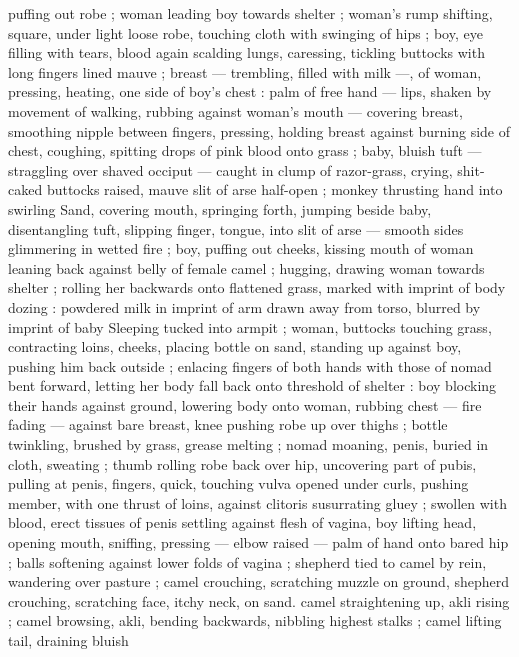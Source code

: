 {puffing out robe ; woman leading boy towards shelter ; woman's 
rump shifting, square, under light loose robe, touching cloth with 
swinging of hips ; boy, eye filling with tears, blood again scalding 
lungs, caressing, tickling buttocks with long fingers lined mauve ; 
breast --- trembling, filled with milk ---, of woman, pressing, heating, 
one side of boy's chest : palm of free hand --- lips, shaken by 
movement of walking, rubbing against woman's mouth --- covering 
breast, smoothing nipple between fingers, pressing, holding breast 
against burning side of chest, coughing, spitting drops of pink blood 
onto grass ; baby, bluish tuft --- straggling over shaved occiput --- 
caught in clump of razor-grass, crying, shit-caked buttocks raised, 
mauve slit of arse half-open ; monkey thrusting hand into swirling 
Sand, covering mouth, springing forth, jumping beside baby, 
disentangling tuft, slipping finger, tongue, into slit of arse --- smooth 
sides glimmering in wetted fire ; boy, puffing out cheeks, kissing 
mouth of woman leaning back against belly of female camel ; 
hugging, drawing woman towards shelter ; rolling her backwards onto 
flattened grass, marked with imprint of body dozing : powdered milk 
in imprint of arm drawn away from torso, blurred by imprint of baby 
Sleeping tucked into armpit ; woman, buttocks touching grass, 
contracting loins, cheeks, placing bottle on sand, standing up against 
boy, pushing him back outside ; enlacing fingers of both hands with 
those of nomad bent forward, letting her body fall back onto 
threshold of shelter : boy blocking their hands against ground, 
lowering body onto woman, rubbing chest --- fire fading --- against 
bare breast, knee pushing robe up over thighs ; bottle twinkling, 
brushed by grass, grease melting ; nomad moaning, penis, buried in 
cloth, sweating ; thumb rolling robe back over hip, uncovering part of 
pubis, pulling at penis, fingers, quick, touching vulva opened under 
curls, pushing member, with one thrust of loins, against clitoris 
susurrating gluey ; swollen with blood, erect tissues of penis settling 
against flesh of vagina, boy lifting head, opening mouth, sniffing, 
pressing --- elbow raised --- palm of hand onto bared hip ; balls 
softening against lower folds of vagina ; shepherd tied to camel by 
rein, wandering over pasture ; camel crouching, scratching muzzle on 
ground, shepherd crouching, scratching face, itchy neck, on sand. 
camel straightening up, akli rising ; camel browsing, akli, bending 
backwards, nibbling highest stalks ; camel lifting tail, draining bluish 
}
